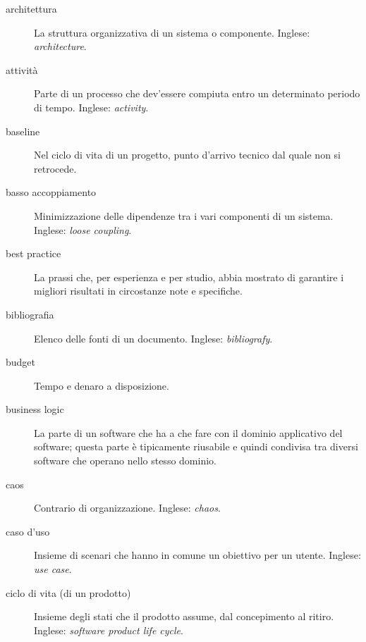 \documentclass[a4paper]{article}
\begin{document}
\begin{description}
	\item[architettura] 

			La struttura organizzativa di un sistema o componente. Inglese: \emph{architecture}.
			
	\item[attività] 

			Parte di un processo che dev'essere compiuta entro un determinato periodo di tempo. Inglese: \emph{activity}.
			
	\item[baseline] 

			Nel ciclo di vita di un progetto, punto d'arrivo tecnico dal quale non si retrocede.
			
	\item[basso accoppiamento] 

			Minimizzazione delle dipendenze tra i vari componenti di un sistema. Inglese: \emph{loose coupling}.
			
	\item[best practice] 

			La prassi che, per esperienza e per studio, abbia mostrato di garantire i migliori risultati in circostanze note e specifiche.
			
	\item[bibliografia] 

			Elenco delle fonti di un documento. Inglese: \emph{bibliografy}.
			
	\item[budget] 

			Tempo e denaro a disposizione.
			
	\item[business logic] 

			La parte di un software che ha a che fare con il dominio applicativo del software; questa parte è tipicamente riusabile e quindi condivisa tra diversi software che operano nello stesso dominio.
			
	\item[caos] 

			Contrario di organizzazione. Inglese: \emph{chaos}.
			
	\item[caso d'uso] 

			Insieme di scenari che hanno in comune un obiettivo per un utente. Inglese: \emph{use case}.
			
	\item[ciclo di vita (di un prodotto)] 

			Insieme degli stati che il prodotto assume, dal concepimento al ritiro. Inglese: \emph{software product life cycle}.
			

\end{description}
\end{document}
